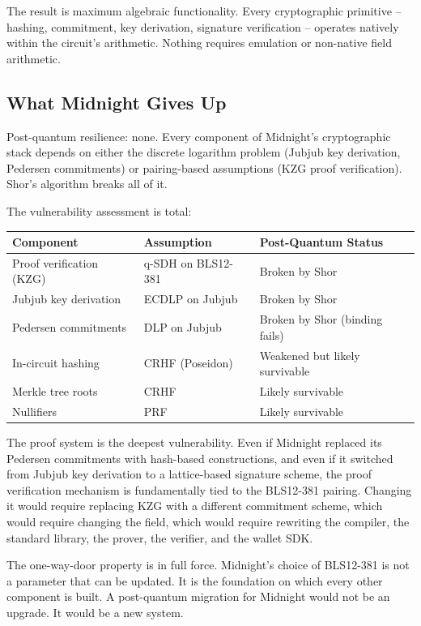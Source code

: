 \documentclass[
  11pt,
  openany]{report}
\begin{document}
The result is maximum algebraic functionality. Every cryptographic primitive --
hashing, commitment, key derivation, signature verification -- operates natively
within the circuit's arithmetic. Nothing requires emulation or non-native field
arithmetic.

\subsection{What Midnight Gives Up}\label{what-midnight-gives-up}

Post-quantum resilience: none. Every component of Midnight's cryptographic stack
depends on either the discrete logarithm problem (Jubjub key derivation,
Pedersen commitments) or pairing-based assumptions (KZG proof verification).
Shor's algorithm breaks all of it.

The vulnerability assessment is total:

\begin{longtable}[]{@{}lll@{}}
\toprule\noalign{}
Component & Assumption & Post-Quantum Status \\
\midrule\noalign{}
\arrayrulecolor{MidnightBlue}\midrule\arrayrulecolor{MidnightBorder}
\endhead
\bottomrule\noalign{}
\endlastfoot
Proof verification (KZG) & q-SDH on BLS12-381 & Broken by Shor \\
Jubjub key derivation & ECDLP on Jubjub & Broken by Shor \\
Pedersen commitments & DLP on Jubjub & Broken by Shor (binding fails) \\
In-circuit hashing & CRHF (Poseidon) & Weakened but likely survivable \\
Merkle tree roots & CRHF & Likely survivable \\
Nullifiers & PRF & Likely survivable \\
\end{longtable}

The proof system is the deepest vulnerability. Even if Midnight replaced its
Pedersen commitments with hash-based constructions, and even if it switched from
Jubjub key derivation to a lattice-based signature scheme, the proof
verification mechanism is fundamentally tied to the BLS12-381 pairing. Changing
it would require replacing KZG with a different commitment scheme, which would
require changing the field, which would require rewriting the compiler, the
standard library, the prover, the verifier, and the wallet SDK.

The one-way-door property is in full force. Midnight's choice of BLS12-381 is
not a parameter that can be updated. It is the foundation on which every other
component is built. A post-quantum migration for Midnight would not be an
upgrade. It would be a new system.
\end{document}
